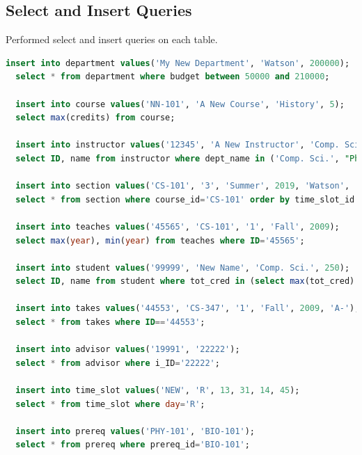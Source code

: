 \documentclass{article}
\begin{document}
\subsection{Select and Insert Queries}
Performed select and insert queries on each table.
\begin{lstlisting}[language=sql]
  insert into department values('My New Department', 'Watson', 200000);
  select * from department where budget between 50000 and 210000;

  insert into course values('NN-101', 'A New Course', 'History', 5);
  select max(credits) from course;

  insert into instructor values('12345', 'A New Instructor', 'Comp. Sci.', 50000);
  select ID, name from instructor where dept_name in ('Comp. Sci.', "Physics");

  insert into section values('CS-101', '3', 'Summer', 2019, 'Watson', '100', 'A');
  select * from section where course_id='CS-101' order by time_slot_id asc;

  insert into teaches values('45565', 'CS-101', '1', 'Fall', 2009);
  select max(year), min(year) from teaches where ID='45565';

  insert into student values('99999', 'New Name', 'Comp. Sci.', 250);
  select ID, name from student where tot_cred in (select max(tot_cred) from student);

  insert into takes values('44553', 'CS-347', '1', 'Fall', 2009, 'A-');
  select * from takes where ID=='44553';

  insert into advisor values('19991', '22222');
  select * from advisor where i_ID='22222';

  insert into time_slot values('NEW', 'R', 13, 31, 14, 45);
  select * from time_slot where day='R';

  insert into prereq values('PHY-101', 'BIO-101');
  select * from prereq where prereq_id='BIO-101';
\end{lstlisting}
\end{document}
